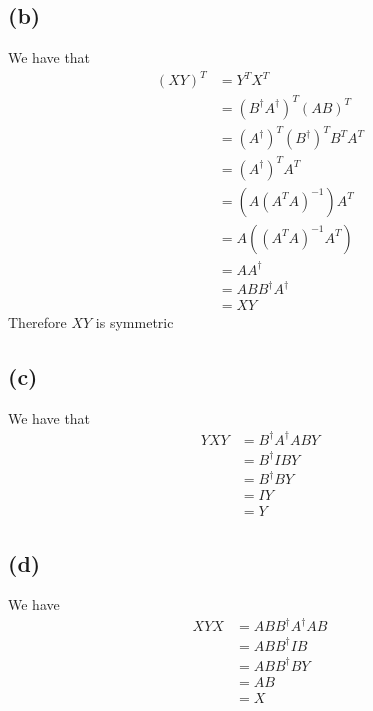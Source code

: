 \subsection*{(b)}
We have that
\begin{align*}
    (XY)^T&=Y^TX^T\\
    &=\left(B^{\dagger}A^{\dagger}\right)^T\left(AB\right)^T\\
    &= \left(A^{\dagger}\right)^T\left(B^{\dagger}\right)^T B^TA^T\\
    &=\left(A^{\dagger}\right)^TA^T\\
    &=\left(A(A^TA)^{-1}\right)A^T\\
    &=A\left((A^TA)^{-1}A^T\right)\\
    &=AA^{\dagger}\\
    &=ABB^{\dagger}A^{\dagger}\\
    &=XY
\end{align*}
Therefore $XY$ is symmetric
\subsection*{(c)}
We have that
\begin{align*}
    YXY&=B^{\dagger}A^{\dagger}ABY\\
    &=B^{\dagger}IBY\\
    &=B^{\dagger}BY\\
    &=IY\\
    &=Y
\end{align*}
\subsection*{(d)}
We have
\begin{align*}
    XYX&=ABB^{\dagger}A^{\dagger}AB\\
    &=ABB^{\dagger}IB\\
    &=ABB^{\dagger}BY\\
    &=AB\\
    &=X
\end{align*}

